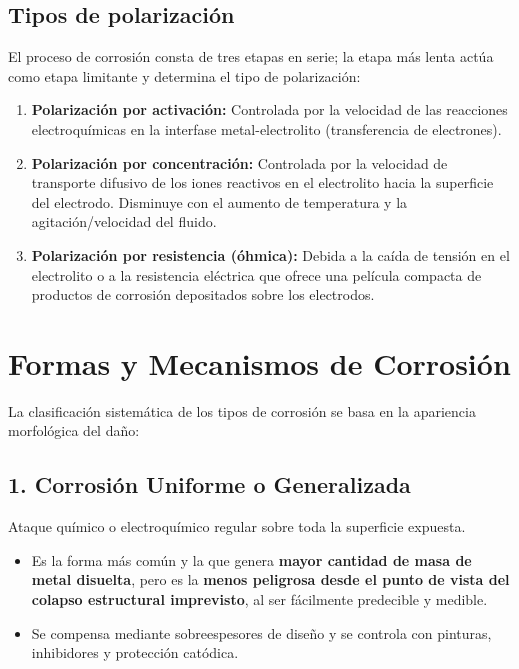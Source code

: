 \subsection{Tipos de polarización}
El proceso de corrosión consta de tres etapas en serie; la etapa más lenta actúa como etapa limitante y determina el tipo de polarización:
\begin{enumerate}
    \item \textbf{Polarización por activación:} Controlada por la velocidad de las reacciones electroquímicas en la interfase metal-electrolito (transferencia de electrones).
    \item \textbf{Polarización por concentración:} Controlada por la velocidad de transporte difusivo de los iones reactivos en el electrolito hacia la superficie del electrodo. Disminuye con el aumento de temperatura y la agitación/velocidad del fluido.
    \item \textbf{Polarización por resistencia (óhmica):} Debida a la caída de tensión en el electrolito o a la resistencia eléctrica que ofrece una película compacta de productos de corrosión depositados sobre los electrodos.
\end{enumerate}


\section{Formas y Mecanismos de Corrosión}

La clasificación sistemática de los tipos de corrosión se basa en la apariencia morfológica del daño:

\subsection{1. Corrosión Uniforme o Generalizada}
Ataque químico o electroquímico regular sobre toda la superficie expuesta.
\begin{itemize}
    \item Es la forma más común y la que genera \textbf{mayor cantidad de masa de metal disuelta}, pero es la \textbf{menos peligrosa desde el punto de vista del colapso estructural imprevisto}, al ser fácilmente predecible y medible.
    \item Se compensa mediante sobreespesores de diseño y se controla con pinturas, inhibidores y protección catódica.
\end{itemize}

